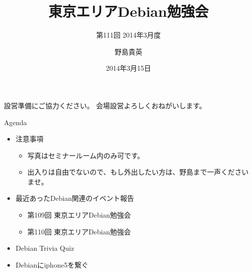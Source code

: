 \title{東京エリアDebian勉強会}
\subtitle{第111回 2014年3月度}
\author{野島貴英}
\date{2014年3月15日}



\begin{frame}
\titlepage{}
\end{frame}

\begin{frame}{設営準備にご協力ください。}
会場設営よろしくおねがいします。
\end{frame}

\begin{frame}{Agenda}
 \begin{minipage}[t]{0.45\hsize}
  \begin{itemize}
   \item 注意事項
	 \begin{itemize}
	  \item 写真はセミナールーム内のみ可です。
          \item 出入りは自由でないので、もし外出したい方は、野島まで一声くださいませ。
	 \end{itemize}
   \item 最近あったDebian関連のイベント報告
	 \begin{itemize}
	  \item 第109回 東京エリアDebian勉強会
	  \item 第110回 東京エリアDebian勉強会
	 \end{itemize}
  \end{itemize}
 \end{minipage} 
 \begin{minipage}[t]{0.45\hsize}
  \begin{itemize}
   \item Debian Trivia Quiz
   \item Debianにiphone5を繋ぐ
  \end{itemize}
 \end{minipage}
\end{frame}

